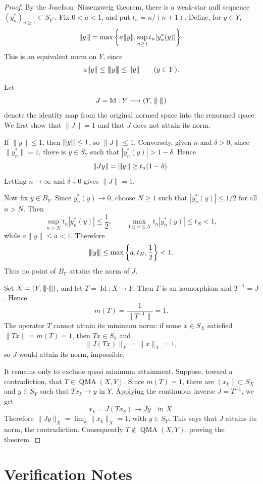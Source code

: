 \documentclass[11pt]{amsart}
\newcommand{\QMA}{\operatorname{QMA}}
\newcommand{\Id}{\operatorname{Id}}
\newcommand{\vertiii}[1]{{\left\vert\kern-0.25ex\left\vert\kern-0.25ex\left\vert #1
\right\vert\kern-0.25ex\right\vert\kern-0.25ex\right\vert}}
\begin{document}
\begin{proof}
By the Josefson--Nissenzweig theorem, there is a weak-star null sequence
\((y_n^*)_{n\geq1}\subset S_{Y^*}\). Fix \(0<a<1\), and put
\(t_n=n/(n+1)\). Define, for \(y\in Y\),
\[
  \vertiii{y}
  =\max\left\{a\|y\|,\sup_{n\geq1} t_n |y_n^*(y)|\right\}.
\]
This is an equivalent norm on \(Y\), since
\[
  a\|y\|\leq \vertiii{y}\leq \|y\|
  \qquad (y\in Y).
\]

Let
\[
  J=\Id:Y\longrightarrow (Y,\vertiii{\cdot})
\]
denote the identity map from the original normed space into the renormed
space. We first show that \(\|J\|=1\) and that \(J\) does not attain its
norm.

If \(\|y\|\leq1\), then \(\vertiii{y}\leq1\), so \(\|J\|\leq1\). Conversely,
given \(n\) and \(\delta>0\), since \(\|y_n^*\|=1\), there is
\(y\in S_Y\) such that \(|y_n^*(y)|>1-\delta\). Hence
\[
  \|J y\|=\vertiii{y}\geq t_n(1-\delta).
\]
Letting \(n\to\infty\) and \(\delta\downarrow0\) gives \(\|J\|=1\).

Now fix \(y\in B_Y\). Since \(y_n^*(y)\to0\), choose \(N\geq1\) such that
\(|y_n^*(y)|\leq1/2\) for all \(n>N\). Then
\[
  \sup_{n>N} t_n|y_n^*(y)|\leq\frac12,
  \qquad
  \max_{1\leq n\leq N} t_n|y_n^*(y)|\leq t_N<1,
\]
while \(a\|y\|\leq a<1\). Therefore
\[
  \vertiii{y}
  \leq \max\left\{a,t_N,\frac12\right\}<1.
\]
Thus no point of \(B_Y\) attains the norm of \(J\).

Set \(X=(Y,\vertiii{\cdot})\), and let \(T=\Id:X\to Y\). Then \(T\) is an
isomorphism and \(T^{-1}=J\). Hence
\[
  m(T)=\frac{1}{\|T^{-1}\|}=1.
\]
The operator \(T\) cannot attain its minimum norm: if some \(x\in S_X\)
satisfied \(\|Tx\|=m(T)=1\), then \(Tx\in S_Y\) and
\[
  \|J(Tx)\|_X=\|x\|_X=1,
\]
so \(J\) would attain its norm, impossible.

It remains only to exclude quasi minimum attainment. Suppose, toward a
contradiction, that \(T\in\QMA(X,Y)\). Since \(m(T)=1\), there are
\((x_k)\subset S_X\) and \(y\in S_Y\) such that \(Tx_k\to y\) in \(Y\).
Applying the continuous inverse \(J=T^{-1}\), we get
\[
  x_k=J(Tx_k)\longrightarrow J y
  \quad\text{in } X.
\]
Therefore \(\|J y\|_X=\lim_k\|x_k\|_X=1\), with \(y\in S_Y\). This says
that \(J\) attains its norm, the contradiction. Consequently
\(T\notin\QMA(X,Y)\), proving the theorem.
\end{proof}

\section*{Verification Notes}
\end{document}
